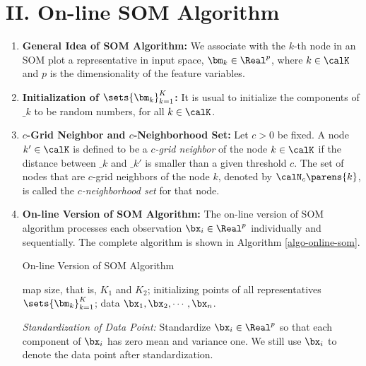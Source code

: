 \documentclass[12pt]{article}
\begin{document}
\section*{II. On-line SOM Algorithm}

\begin{enumerate}[label=\textbf{\arabic*.}]
	
	\item \textbf{General Idea of SOM Algorithm:} We associate with the $k$-th node in an SOM plot a representative in input space, $\bm_k \in \Real^p$, where $k \in \calK$ and $p$ is the dimensionality of the feature variables. 
	
	\item \textbf{Initialization of $\sets{\bm_k}_{k=1}^K$:} It is usual to initialize the components of $\bm_k$ to be random numbers, for all $k \in \calK$. 
	
	\item \textbf{$c$-Grid Neighbor and $c$-Neighborhood Set:} Let $c > 0$ be fixed. A node $k' \in \calK$ is defined to be a \emph{$c$-grid neighbor} of the node $k \in \calK$ if the distance between $\bm_k$ and $\bm_{k'}$ is smaller than a given threshold $c$. The set of nodes that are $c$-grid neighbors of the node $k$, denoted by $\calN_c \parens{k}$, is called the \emph{$c$-neighborhood set} for that node. 
	
	\item \textbf{On-line Version of SOM Algorithm:} The on-line version of SOM algorithm processes each observation $\bx_i \in \Real^p$ individually and sequentially. The complete algorithm is shown in Algorithm \ref{algo-online-som}. 
	
	\begin{minipage}{\linewidth}
		\begin{algorithm}[H]
			\caption{On-line Version of SOM Algorithm}\label{algo-online-som}
			\begin{algorithmic}[1]
				\REQUIRE map size, that is, $K_1$ and $K_2$; 
				\REQUIRE initializing points of all representatives $\sets{\bm_k}_{k=1}^K$; 
				\REQUIRE data $\bx_1, \bx_2, \cdots, \bx_n$. 
				
				\vspace{10pt}
				\STATE \textit{Standardization of Data Point:} Standardize $\bx_i \in \Real^p$ so that each component of $\bx_i$ has zero mean and variance one. We still use $\bx_i$ to denote the data point after standardization. 
				

\end{algorithmic}
\end{algorithm}
\end{minipage}
\end{enumerate}
\end{document}
